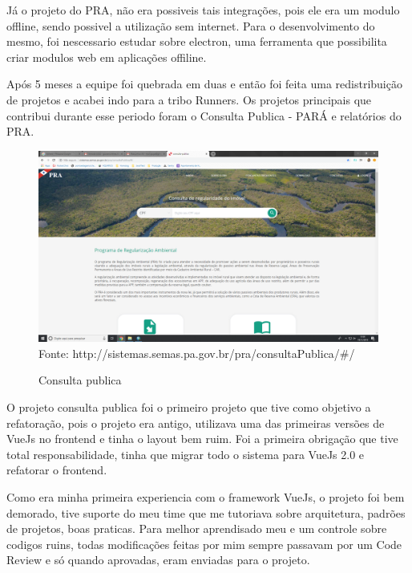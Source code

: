 Já o projeto do PRA, não era possiveis tais integrações, pois ele era um modulo offline, sendo possivel a utilização sem internet. Para o desenvolvimento do mesmo, foi nescessario estudar sobre electron, uma ferramenta que possibilita criar modulos web em aplicações offiline.

Após 5 meses a equipe foi quebrada em duas e então foi feita uma redistribuição de projetos e acabei indo para a tribo Runners. Os projetos principais que contribui durante esse periodo foram o Consulta Publica - PARÁ e relatórios do PRA.

\begin{figure}[H]
\centering
\caption{Consulta publica} %
\includegraphics[scale=0.22]{consulta-publica}\\  %
{\small Fonte: http://sistemas.semas.pa.gov.br/pra/consultaPublica/#/} %
\label{fig:exemplo} %
\end{figure}

O projeto consulta publica foi o primeiro projeto que tive como objetivo a refatoração, pois o projeto era antigo, utilizava uma das primeiras versões de VueJs no frontend e tinha o layout bem ruim.
Foi a primeira obrigação que tive total responsabilidade, tinha que migrar todo o sistema para VueJs 2.0 e refatorar o frontend.

Como era minha primeira experiencia com o framework VueJs, o projeto foi bem demorado, tive suporte do meu time que me tutoriava sobre arquitetura, padrões de projetos, boas praticas.
Para melhor aprendisado meu e um controle sobre codigos ruins, todas modificações feitas por mim sempre passavam por um Code Review e só quando aprovadas, eram enviadas para o projeto. 

